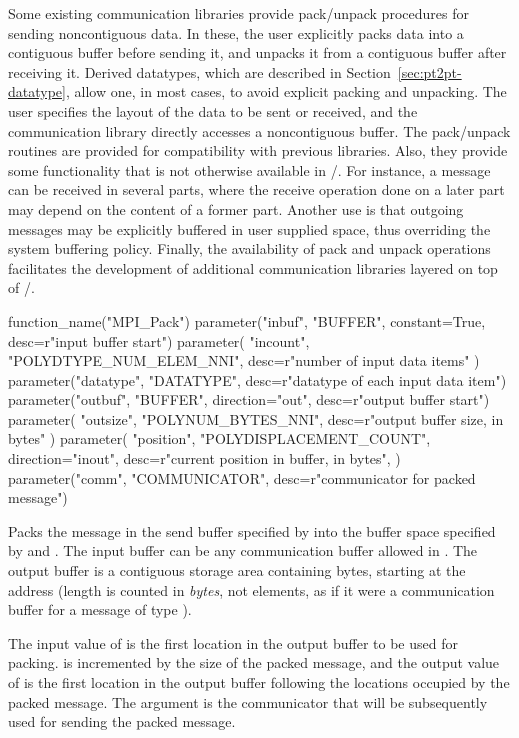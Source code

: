 Some existing communication libraries provide pack/unpack procedures for sending
noncontiguous data. In these, the user explicitly packs
data into a contiguous buffer
before sending it, and unpacks it from a contiguous buffer after receiving it.
Derived datatypes, which are described in
Section~\ref{sec:pt2pt-datatype}, allow one, in most cases, to avoid
explicit packing and unpacking.  The user specifies the layout of
the data to be sent or received, and the communication library directly
accesses a noncontiguous buffer.  The pack/unpack routines are provided for
compatibility with previous libraries.   Also, they provide some functionality
that is not otherwise available in \MPI/.
For instance, a message can be received in several
parts, where the receive operation done on
a later part may depend on the content of a former part.
Another use is that outgoing messages
may be explicitly buffered in user supplied space, thus overriding the system
buffering policy.   Finally, the availability of pack and unpack operations
facilitates the development of additional communication libraries layered on top
of \MPI/.

\begin{mpi-binding}
    function_name("MPI_Pack")
    parameter("inbuf", "BUFFER", constant=True, desc=r"input buffer start")
    parameter(
        "incount", "POLYDTYPE_NUM_ELEM_NNI", desc=r"number of input data items"
    )
    parameter("datatype", "DATATYPE", desc=r"datatype of each input data item")
    parameter("outbuf", "BUFFER", direction="out", desc=r"output buffer start")
    parameter(
        "outsize", "POLYNUM_BYTES_NNI", desc=r"output buffer size, in bytes"
    )
    parameter(
        "position",
        "POLYDISPLACEMENT_COUNT",
        direction="inout",
        desc=r"current position in buffer, in bytes",
    )
    parameter("comm", "COMMUNICATOR", desc=r"communicator for packed message")
\end{mpi-binding}

Packs the message in the send buffer specified by  into the buffer
space specified by  and
.  The
input buffer can
be any communication buffer allowed in .  The output buffer
is a contiguous storage area containing  bytes, starting at
the address  (length is counted in \emph{bytes}, not elements,
as if it were a communication buffer for a message of type ).

The input value of  is the first
location in the output buffer to be used for packing.   is
incremented by the size of the packed message, and the output value of
 is the first location in the output buffer
following the locations occupied by the packed message.
The  argument
is the communicator that will be subsequently used for sending the packed
message.

